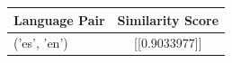 \begin{tabular}{|l|c|}
\hline
Language Pair & Similarity Score \\
\hline
('es', 'en') & [[0.9033977]] \\
\hline
\end{tabular}

